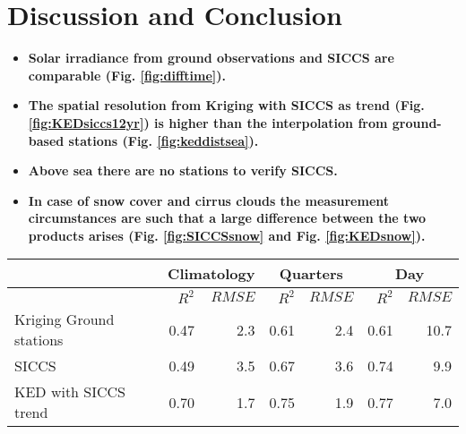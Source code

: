 \documentclass[]{article}
\begin{document}
\section*{Discussion and Conclusion}
\begin{itemize}

\item \textbf{ Solar irradiance from ground observations and SICCS are comparable (Fig. \ref{fig:difftime}).}

\item \textbf{The spatial resolution from Kriging with SICCS as trend (Fig. \ref{fig:KEDsiccs12yr}) is higher than the interpolation from ground-based stations (Fig. \ref{fig:keddistsea}).} 

\item \textbf{Above sea there are no stations to verify SICCS.}  

\item \textbf{In case of snow cover and cirrus clouds the measurement circumstances are such that a large difference between the two products arises (Fig. \ref{fig:SICCSsnow} and Fig. \ref{fig:KEDsnow}).}  

\end{itemize}

\vspace{20pt plus 10pt minus 5pt}
\begin{minipage}[b]{\columnwidth}
	\begin{center}
		\begin{tabular}{l  r  | r  | r | r | r |r }
			
			
			\hline
			& \multicolumn{2}{c|}{Climatology} & \multicolumn{2}{c|}{Quarters} & \multicolumn{2}{c}{Day} \\
			\hline
			& {$R^2$} &  {$RMSE$} &  {$R^2$} &  {$RMSE$} &  {$R^2$} &  {$RMSE$} \\
			\cline{1-4}
			
			\hline
			Kriging Ground stations 	& 0.47	& 2.3  	& 0.61	& 2.4		& 0.61	& 10.7 \\
			SICCS 					& 0.49 	& 3.5 	& 0.67 	& 3.6 		& 0.74 	& 9.9 	\\
			KED with SICCS trend 				& 0.70 	& 1.7 	& 0.75 	& 1.9	  	& 0.77 	& 7.0 	\\ %
			\hline
		\end{tabular}
	\end{center}
	\label{table}
\end{minipage}
\end{document}
